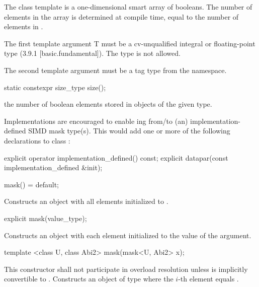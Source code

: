 

\pnum The class template \mask[<T, Abi>] is a one-dimensional smart array of booleans.
The number of elements in the array is determined at compile time, equal to the number of elements in \datapar[<T, Abi>].

\pnum The first template argument \type T must be a cv-unqualified integral or floating-point type (3.9.1 [basic.fundamental]).
The type \bool is not allowed.

\pnum The second template argument  must be a tag type from the  namespace.

\begin{itemdecl}
static constexpr size_type size();
\end{itemdecl}
\begin{itemdescr}
  \pnum\returns the number of boolean elements stored in objects of the given \mask[<T, Abi>] type.
\end{itemdescr}

\pnum\realnote Implementations are encouraged to enable ing from/to (an) implementation-defined SIMD mask type(s).
This would add one or more of the following declarations to class \mask:
\begin{itemdecl}
explicit operator implementation_defined() const;
explicit datapar(const implementation_defined &init);
\end{itemdecl}

\begin{itemdecl}
mask() = default;
\end{itemdecl}
\begin{itemdescr}
  \pnum\effects Constructs an object with all elements initialized to .
\end{itemdescr}

\begin{itemdecl}
explicit mask(value_type);
\end{itemdecl}
\begin{itemdescr}
  \pnum\effects Constructs an object with each element initialized to the value of the argument.
\end{itemdescr}

\begin{itemdecl}
template <class U, class Abi2> mask(mask<U, Abi2> x);
\end{itemdecl}
\begin{itemdescr}
  \pnum\remarks This constructor shall not participate in overload resolution unless
    \datapar[<U, Abi2>] is implicitly convertible to \datapar[<T, Abi>].
  \pnum\effects Constructs an object of type \mask where the $i$-th element equals  \foralli.
\end{itemdescr}

